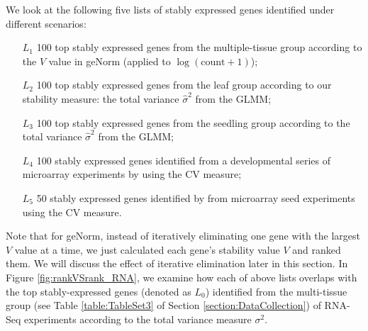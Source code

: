 \documentclass[11pt, a4paper]{article}
\begin{document}
We look at the following five lists of stably expressed genes identified under
different scenarios: 
\begin{enumerate}
    \item[$L_1$]
 100 top stably expressed genes from the multiple-tissue group according
 to the $V$ value in geNorm (applied to $\log(\text{count}+1)$); 
\item[$L_2$]	
100 top stably expressed genes from the leaf group according to our
stability measure: the total variance $\hat\sigma^2$ from the GLMM; 
\item[$L_3$]
100 top stably expressed genes from the seedling group according to
the total variance $\hat\sigma^2$ from the GLMM;
\item[$L_4$]
100 stably expressed genes identified from a developmental series of microarray
experiments by \cite{czechowski2005genome} using the CV measure; 
\item[$L_5$] 50 stably expressed genes identified by \cite{dekkers2012identification} from microarray
seed experiments using the CV measure.  
\end{enumerate}
 Note that for geNorm,
 instead of iteratively eliminating one gene with the largest $V$ value at a
 time, we just calculated each gene's stability value $V$ and ranked them. We will discuss the
 effect of iterative elimination later in this section.  In Figure \ref{fig:rankVSrank_RNA}, %
we examine how each of above lists overlaps with the top stably-expressed
genes (denoted as $L_0$) identified from the multi-tissue group (see Table \ref{table:TableSet3} of Section \ref{section:DataCollection}) of RNA-Seq experiments
according to the total variance measure $\sigma^2$.
\end{document}
